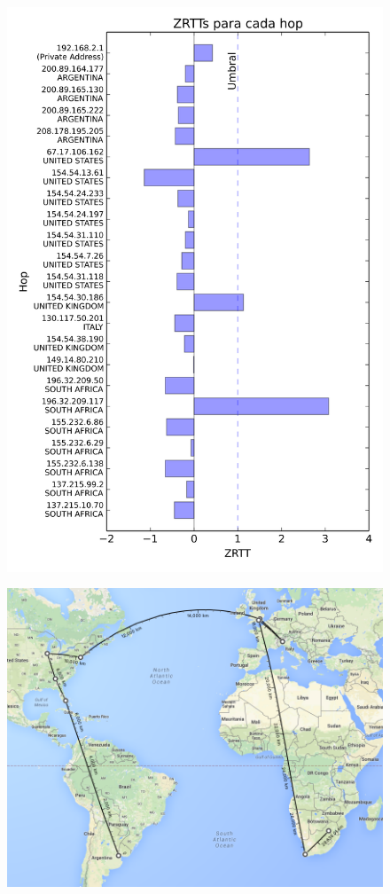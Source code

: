 \begin{figure}[htp]
 \centering
 \includegraphics[scale=0.5]{imgs/pretoria.png}
\end{figure}

\begin{figure}[htp]
 \centering
  \includegraphics[width=5in]{imgs/maps/pretoria.png}
\end{figure}
